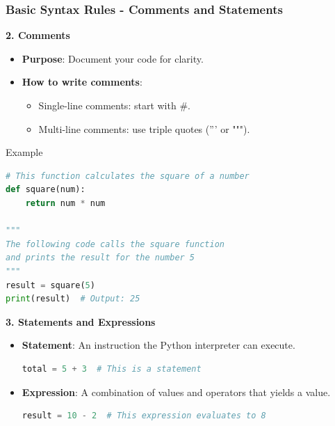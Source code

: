\documentclass{beamer}
\begin{document}
\begin{frame}[fragile]
    \frametitle{Basic Syntax Rules - Comments and Statements}
    \textbf{2. Comments}
    \begin{itemize}
        \item \textbf{Purpose}: Document your code for clarity.
        \item \textbf{How to write comments}:
        \begin{itemize}
            \item Single-line comments: start with \#.
            \item Multi-line comments: use triple quotes (''' or """).
        \end{itemize}
    \end{itemize}
    \begin{block}{Example}
    \begin{lstlisting}[language=Python]
# This function calculates the square of a number
def square(num):
    return num * num

"""
The following code calls the square function
and prints the result for the number 5
"""
result = square(5)
print(result)  # Output: 25
    \end{lstlisting}
    \end{block}

    \textbf{3. Statements and Expressions}
    \begin{itemize}
        \item \textbf{Statement}: An instruction the Python interpreter can execute.
        \begin{lstlisting}[language=Python]
total = 5 + 3  # This is a statement
        \end{lstlisting}
        \item \textbf{Expression}: A combination of values and operators that yields a value.
        \begin{lstlisting}[language=Python]
result = 10 - 2  # This expression evaluates to 8
        \end{lstlisting}
    \end{itemize}
\end{frame}
\end{document}
